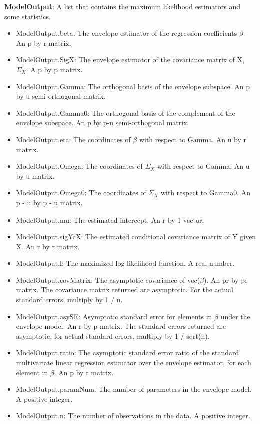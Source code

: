 \documentclass[a4paper,11pt,openany]{memoir}
\begin{document}
\begin{par}
\textbf{ModelOutput}: A list that contains the maximum likelihood estimators and some statistics.
\end{par} \vspace{1em}
\begin{itemize}
\setlength{\itemsep}{-1ex}
   \item ModelOutput.beta: The envelope estimator of the regression coefficients $\beta$. An p by r matrix.
   \item ModelOutput.SigX: The envelope estimator of the covariance matrix of X, $\Sigma_X$.  A p by p matrix.
   \item ModelOutput.Gamma: The orthogonal basis of the envelope subspace. An p by u semi-orthogonal matrix.
   \item ModelOutput.Gamma0: The orthogonal basis of the complement of the envelope subspace.  An p by p-u semi-orthogonal matrix.
   \item ModelOutput.eta: The coordinates of $\beta$ with respect to Gamma. An u by r matrix.
   \item ModelOutput.Omega: The coordinates of $\Sigma_X$ with respect to Gamma. An u by u matrix.
   \item ModelOutput.Omega0: The coordinates of $\Sigma_X$ with respect to Gamma0. An p - u by p - u matrix.
   \item ModelOutput.mu: The estimated intercept.  An r by 1 vector.
   \item ModelOutput.sigYcX: The estimated conditional covariance matrix of Y given X. An r by r matrix.
   \item ModelOutput.l: The maximized log likelihood function.  A real number.
   \item ModelOutput.covMatrix: The asymptotic covariance of vec($\beta$).  An pr by pr matrix.  The covariance matrix returned are asymptotic.  For the actual standard errors, multiply by 1 / n.
   \item ModelOutput.asySE: Asymptotic standard error for elements in $\beta$ under the envelope model.  An r by p matrix.  The standard errors returned are asymptotic, for actual standard errors, multiply by 1 / sqrt(n).
   \item ModelOutput.ratio: The asymptotic standard error ratio of the standard multivariate linear regression estimator over the envelope estimator, for each element in $\beta$.  An p by r matrix.
   \item ModelOutput.paramNum: The number of parameters in the envelope model.  A positive integer.
   \item ModelOutput.n: The number of observations in the data.  A positive integer.
\end{itemize}
\end{document}
